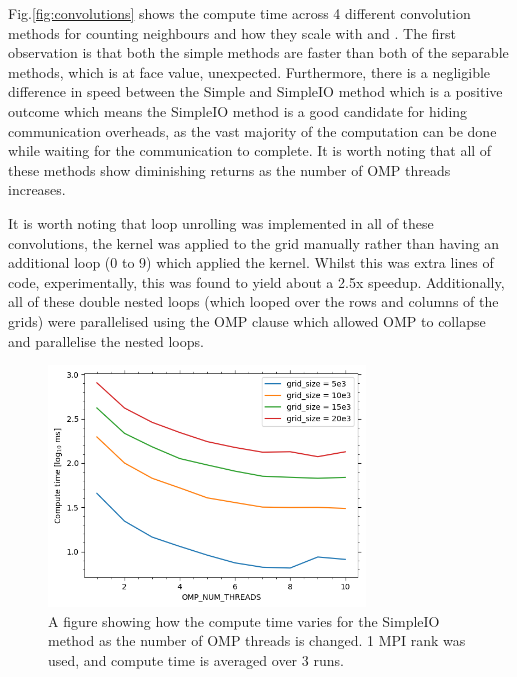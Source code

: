     Fig.\eqref{fig:convolutions} shows the compute time across 4 different convolution methods for counting neighbours
    and how they scale with  and .
    The first observation is that both the simple methods are faster than both of the separable methods, which is
    at face value, unexpected.
    Furthermore, there is a negligible difference in speed between the Simple and SimpleIO method which is a positive
    outcome which means the SimpleIO method is a good candidate for hiding communication overheads, as the vast majority
    of the computation can be done while waiting for the communication to complete.
    It is worth noting that all of these methods show diminishing returns as the number of OMP threads increases.

    It is worth noting that loop unrolling was implemented in all of these convolutions, the kernel was applied
    to the grid manually rather than having an additional loop (0 to 9) which applied the kernel.
    Whilst this was extra lines of code, experimentally, this was found to yield about a 2.5x speedup.
    Additionally, all of these double nested loops (which looped over the rows and columns of the grids) were parallelised
    using the OMP  clause which allowed OMP to collapse and parallelise the
    nested loops.

    \begin{figure}[htb]
    \centering
    \includegraphics[width=0.75\textwidth]{./figures/simpleio}
    \caption{A figure showing how the compute time varies for the SimpleIO method as the number of OMP threads is changed.
    1 MPI rank was used, and compute time is averaged over 3 runs.}
    \label{fig:simpleio}
    \end{figure}

